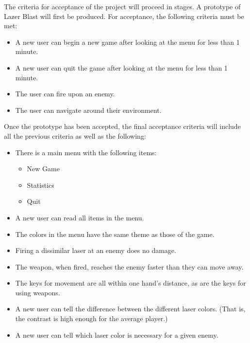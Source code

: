 The criteria for acceptance of the project will proceed in stages.
A prototype of Lazer Blast will first be produced.  For acceptance,
the following criteria must be met:

\begin{itemize}
    \item A new user can begin a new game after looking at the menu
          for less than 1 minute.
    \item A new user can quit the game after looking at the menu
          for less than 1 minute.

    \item The user can fire upon an enemy.
    \item The user can navigate around their environment.
\end{itemize}

Once the prototype has been accepted, the final acceptance criteria
will include all the previous criteria as well as the following:

\begin{itemize}
    \item There is a main menu with the following items:
    \begin{itemize}
        \item New Game
        \item Statistics
        \item Quit
    \end{itemize}
    \item A new user can read all items in the menu.
    \item The colors in the menu have the same theme as those of the game.

    \item Firing a dissimilar laser at an enemy does no damage.
    \item The weapon, when fired, reaches the enemy faster than they can move away.
    \item The keys for movement are all within one hand's distance, as are the
          keys for using weapons.
    \item A new user can tell the difference between the different laser colors. (That
          is, the contrast is high enough for the average player.)
    \item A new user can tell which laser color is necessary for a given enemy.
\end{itemize}
